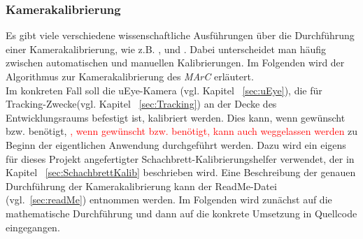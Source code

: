 \subsubsection{Kamerakalibrierung}\label{sec:camCalib}
Es gibt viele verschiedene wissenschaftliche Ausführungen über die Durchführung einer Kamerakalibrierung, wie z.B. \cite{5982395}, \cite{888718} und \cite{faugeras1993three}. Dabei unterscheidet man häufig zwischen automatischen und manuellen Kalibrierungen. Im Folgenden wird der Algorithmus zur Kamerakalibrierung des \textit{MArC} erläutert.  \\
Im konkreten Fall soll die uEye-Kamera (vgl. Kapitel ~\ref{sec:uEye}), die für Tracking-Zwecke(vgl. Kapitel ~\ref{sec:Tracking}) an der Decke des Entwicklungsraums befestigt ist, kalibriert werden. Dies kann, wenn gewünscht bzw. benötigt, \textcolor{red}{, wenn gewünscht bzw. benötigt, kann auch weggelassen werden} zu Beginn der eigentlichen Anwendung durchgeführt werden. Dazu wird ein eigens für dieses Projekt angefertigter Schachbrett-Kalibrierungshelfer verwendet, der in Kapitel ~\ref{sec:SchachbrettKalib} beschrieben wird. Eine Beschreibung der genauen Durchführung der Kamerakalibrierung kann der ReadMe-Datei (vgl.~\ref{sec:readMe}) entnommen werden. Im Folgenden wird zunächst auf die mathematische Durchführung und dann auf die konkrete Umsetzung in Quellcode eingegangen.\\

